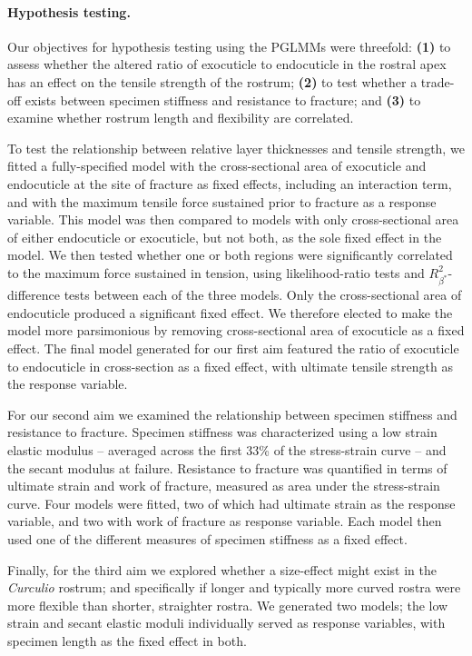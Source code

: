 \documentclass[twocolumn, linenumbers, superscriptaddress, nofootinbib]{revtex4-1}
\begin{document}
			\paragraph*{Hypothesis testing.}
				Our objectives for hypothesis testing using the PGLMMs were threefold: \textbf{(1)} to assess whether the altered ratio of exocuticle to endocuticle in the rostral apex has an effect on the tensile strength of the rostrum; \textbf{(2)} to test whether a trade-off exists between specimen stiffness and resistance to fracture; and \textbf{(3)} to examine whether rostrum length and flexibility are correlated.
				
				To test the relationship between relative layer thicknesses and tensile strength, we fitted a fully-specified model with the cross-sectional area of exocuticle and endocuticle at the site of fracture as fixed effects, including an interaction term, and with the maximum tensile force sustained prior to fracture as a response variable.
				This model was then compared to models with only cross-sectional area of either endocuticle or exocuticle, but not both, as the sole fixed effect in the model.
				We then tested whether one or both regions were significantly correlated to the maximum force sustained in tension, using likelihood-ratio tests and $R^{2}_{\beta^*}$-difference tests between each of the three models.
				Only the cross-sectional area of endocuticle produced a significant fixed effect.
				We therefore elected to make the model more parsimonious by removing cross-sectional area of exocuticle as a fixed effect.
				The final model generated for our first aim featured the ratio of exocuticle to endocuticle in cross-section as a fixed effect, with ultimate tensile strength as the response variable.
				
				For our second aim we examined the relationship between specimen stiffness and resistance to fracture.
				Specimen stiffness was characterized using a low strain elastic modulus -- averaged across the first 33\% of the stress-strain curve -- and the secant modulus at failure.
				Resistance to fracture was quantified in terms of ultimate strain and work of fracture, measured as area under the stress-strain curve.
				Four models were fitted, two of which had ultimate strain as the response variable, and two with work of fracture as response variable.
				Each model then used one of the different measures of specimen stiffness as a fixed effect.
				
				Finally, for the third aim we explored whether a size-effect might exist in the \textit{Curculio} rostrum; and specifically if longer and typically more curved rostra were more flexible than shorter, straighter rostra.
				We generated two models; the low strain and secant elastic moduli individually served as response variables, with specimen length as the fixed effect in both.
\end{document}
